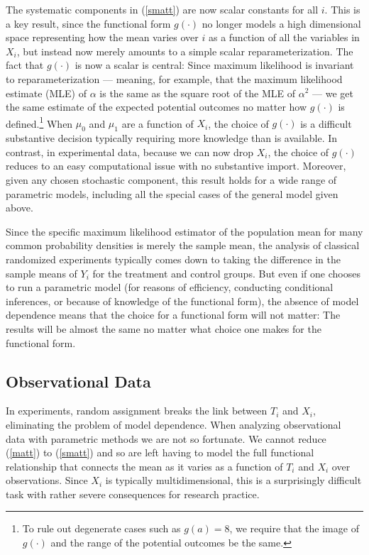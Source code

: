 \documentclass[11pt,titlepage]{article}
\begin{document}
The systematic components in (\ref{smatt}) are now scalar constants
for all $i$.  This is a key result, since the functional form
$g(\cdot)$ no longer models a high dimensional space representing how
the mean varies over $i$ as a function of all the variables in $X_i$,
but instead now merely amounts to a simple scalar reparameterization.
The fact that $g(\cdot)$ is now a scalar is central: Since maximum
likelihood is invariant to reparameterization --- meaning, for
example, that the maximum likelihood estimate (MLE) of $\alpha$ is the
same as the square root of the MLE of $\alpha^2$
\citep[][p. 75--76]{King89} --- we get the same estimate of the
expected potential outcomes no matter how $g(\cdot)$ is
defined.\footnote{To rule out degenerate cases such as $g(a)=8$, we
  require that the image of $g(\cdot)$ and the range of the potential
  outcomes be the same.}  When $\mu_0$ and $\mu_1$ are a function of
$X_i$, the choice of $g(\cdot)$ is a difficult substantive decision
typically requiring more knowledge than is available.  In contrast, in
experimental data, because we can now drop $X_i$, the choice of
$g(\cdot)$ reduces to an easy computational issue with no substantive
import.  Moreover, given any chosen stochastic component, this result
holds for a wide range of parametric models, including all the special
cases of the general model given above.

Since the specific maximum likelihood estimator of the population mean
for many common probability densities is merely the sample mean, the
analysis of classical randomized experiments typically comes down to
taking the difference in the sample means of $Y_i$ for the treatment
and control groups.  But even if one chooses to run a parametric model
(for reasons of efficiency, conducting conditional inferences, or
because of knowledge of the functional form), the absence of model
dependence means that the choice for a functional form will not
matter: The results will be almost the same no matter what choice one
makes for the functional form.

\subsection{Observational Data} \label{s:paraobs}

In experiments, random assignment breaks the link between $T_i$ and
$X_i$, eliminating the problem of model dependence.
When analyzing observational data with parametric methods we are not
so fortunate.  We cannot reduce (\ref{matt}) to (\ref{smatt}) and so
are left having to model the full functional relationship that
connects the mean as it varies as a function of $T_i$ and $X_i$ over
observations.  Since $X_i$ is typically multidimensional, this is a
surprisingly difficult task with rather severe consequences for
research practice.
\end{document}
